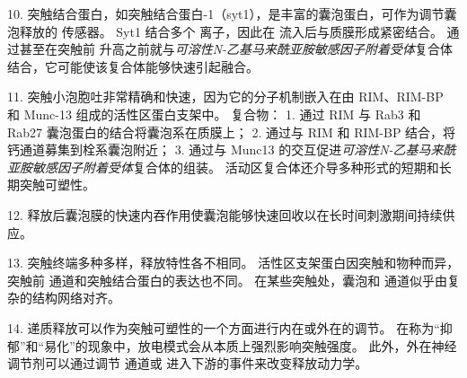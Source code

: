 10. 突触结合蛋白，如突触结合蛋白-1（syt1），是丰富的囊泡蛋白，可作为调节囊泡释放的  传感器。
Syt1 结合多个  离子，因此在  流入后与质膜形成紧密结合。
通过甚至在突触前  升高之前就与\textit{可溶性N-乙基马来酰亚胺敏感因子附着受体}复合体结合，它可能使该复合体能够快速引起融合。


11. 突触小泡胞吐非常精确和快速，因为它的分子机制嵌入在由 RIM、RIM-BP 和 Munc-13 组成的活性区蛋白支架中。
复合物：
1. 通过 RIM 与 Rab3 和 Rab27 囊泡蛋白的结合将囊泡系在质膜上；
2. 通过与 RIM 和 RIM-BP 结合，将钙通道募集到栓系囊泡附近；
3. 通过与 Munc13 的交互促进\textit{可溶性N-乙基马来酰亚胺敏感因子附着受体}复合体的组装。
活动区复合体还介导多种形式的短期和长期突触可塑性。 


12. 释放后囊泡膜的快速内吞作用使囊泡能够快速回收以在长时间刺激期间持续供应。


13. 突触终端多种多样，释放特性各不相同。
活性区支架蛋白因突触和物种而异，突触前  通道和突触结合蛋白的表达也不同。
在某些突触处，囊泡和  通道似乎由复杂的结构网络对齐。 


14. 递质释放可以作为突触可塑性的一个方面进行内在或外在的调节。
在称为“抑郁”和“易化”的现象中，放电模式会从本质上强烈影响突触强度。
此外，外在神经调节剂可以通过调节  通道或  进入下游的事件来改变释放动力学。





